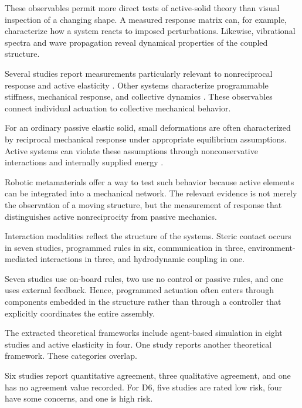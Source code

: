 These observables permit more direct
tests of active-solid theory than
visual inspection of a changing shape.
A measured response matrix can,
for example, characterize how a
system reacts to imposed perturbations.
Likewise, vibrational spectra and
wave propagation reveal dynamical
properties of the coupled structure.

Several studies report measurements
particularly relevant to nonreciprocal
response and active elasticity
\cite{Brandenbourger2019nonreciprocalrobot,Brandenbourger2021limitcyclesturnac,Binysh2026moreislessinunpe,Coulais2025activemetamaterials}.
Other systems characterize
programmable stiffness,
mechanical response,
and collective dynamics
\cite{Du2026metamaterialsthatl,Chen2020selfsensingmetamat,Baconnier2022tensioncontrolledc,Zhang2026noiseenhancedtempo}.
These observables connect
individual actuation to
collective mechanical behavior.

For an ordinary passive elastic
solid, small deformations are
often characterized by
reciprocal mechanical response
under appropriate equilibrium
assumptions. Active systems
can violate these assumptions
through nonconservative
interactions and internally
supplied energy
\cite{Scheibner2020odd}.

Robotic metamaterials offer a
way to test such behavior
because active elements can
be integrated into a
mechanical network.
The relevant evidence
is not merely the
observation of a moving
structure, but the
measurement of response
that distinguishes
active nonreciprocity
from passive mechanics.

Interaction modalities reflect
the structure of the systems.
Steric contact occurs in seven
studies, programmed rules in six,
communication in three,
environment-mediated interactions
in three, and hydrodynamic
coupling in one.

Seven studies use on-board
rules, two use no control
or passive rules, and one
uses external feedback.
Hence, programmed actuation
often enters through
components embedded in
the structure rather
than through a controller
that explicitly coordinates
the entire assembly.

The extracted theoretical
frameworks include agent-based
simulation in eight studies
and active elasticity in four.
One study reports another
theoretical framework.
These categories overlap.

Six studies report quantitative
agreement, three qualitative
agreement, and one has no
agreement value recorded.
For D6, five studies are
rated low risk, four have
some concerns, and one
is high risk.

